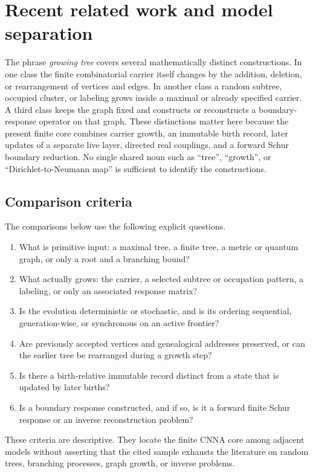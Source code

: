 \documentclass[11pt]{article}
\theoremstyle{remark}
\numberwithin{equation}{section}
\begin{document}
\section{Recent related work and model separation}\label{sec:related-work}
The phrase \emph{growing tree} covers several mathematically distinct constructions. In one class the finite combinatorial carrier itself changes by the addition, deletion, or rearrangement of vertices and edges. In another class a random subtree, occupied cluster, or labeling grows inside a maximal or already specified carrier. A third class keeps the graph fixed and constructs or reconstructs a boundary-response operator on that graph. These distinctions matter here because the present finite core combines carrier growth, an immutable birth record, later updates of a separate live layer, directed real couplings, and a forward Schur boundary reduction. No single shared noun such as ``tree'', ``growth'', or ``Dirichlet-to-Neumann map'' is sufficient to identify the constructions.

\subsection{Comparison criteria}
The comparisons below use the following explicit questions.
\begin{enumerate}
\item What is primitive input: a maximal tree, a finite tree, a metric or quantum graph, or only a root and a branching bound?
\item What actually grows: the carrier, a selected subtree or occupation pattern, a labeling, or only an associated response matrix?
\item Is the evolution deterministic or stochastic, and is its ordering sequential, generation-wise, or synchronous on an active frontier?
\item Are previously accepted vertices and genealogical addresses preserved, or can the earlier tree be rearranged during a growth step?
\item Is there a birth-relative immutable record distinct from a state that is updated by later births?
\item Is a boundary response constructed, and if so, is it a forward finite Schur response or an inverse reconstruction problem?
\end{enumerate}
These criteria are descriptive. They locate the finite CNNA core among adjacent models without asserting that the cited sample exhausts the literature on random trees, branching processes, graph growth, or inverse problems.
\end{document}
